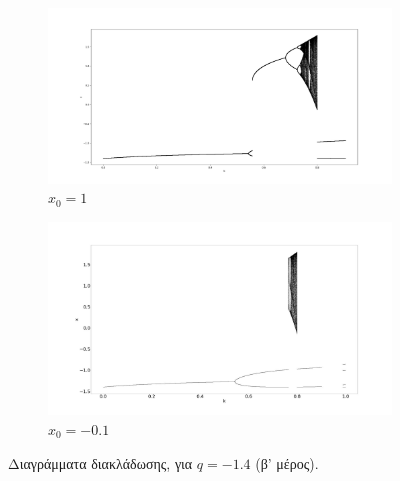 \begin{figure}
	\centering
	\begin{subfigure}[b]{1\textwidth}
		\centering
		\includegraphics[width=\textwidth]{LateX images/graphs q14/g3}
		\caption{\(x_0=1\)}
		\label{f:g21}
	\end{subfigure}
	\hfill
	\begin{subfigure}[b]{1\textwidth}
		\centering
		\includegraphics[width=\textwidth]{LateX images/graphs q14/g4}
		\caption{\(x_0=-0.1\)}
		\label{f:g22}
	\end{subfigure}
	\hfill
	\caption{ Διαγράμματα διακλάδωσης, για $q=-1.4$ (β' μέρος).}
	\label{f:21}
\end{figure}

